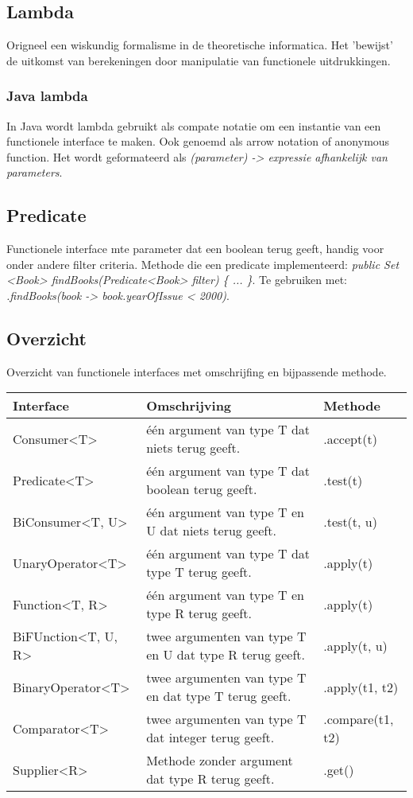 \subsection{Lambda}
Origneel een wiskundig formalisme in de theoretische informatica.
Het 'bewijst' de uitkomst van berekeningen door manipulatie van functionele uitdrukkingen.

\subsubsection{Java lambda}
In Java wordt lambda gebruikt als compate notatie om een instantie van een functionele interface te maken.
Ook genoemd als arrow notation of anonymous function.
Het wordt geformateerd als \textit{(parameter) -> expressie afhankelijk van parameters}.

\subsection{Predicate}
Functionele interface mte parameter dat een boolean terug geeft, handig voor onder andere filter criteria.
Methode die een predicate implementeerd: \textit{public Set <Book> findBooks(Predicate<Book> filter) \{ ... \}}.
Te gebruiken met: \textit{.findBooks(book -> book.yearOfIssue < 2000)}.

\subsection{Overzicht}
Overzicht van functionele interfaces met omschrijfing en bijpassende methode.
\begin{center}
    \begin{longtable}{lp{5cm}l}
        Interface   & Omschrijving & Methode \\
        \midrule
        Consumer<T>         & \'e\'en argument van type T dat niets terug geeft.        & .accept(t) \\
        Predicate<T>        & \'e\'en argument van type T dat boolean terug geeft.      & .test(t) \\
        BiConsumer<T, U>    & \'e\'en argument van type T en U dat niets terug geeft.   & .test(t, u) \\
        UnaryOperator<T>    & \'e\'en argument van type T dat type T terug geeft.       & .apply(t) \\
        Function<T, R>      & \'e\'en argument van type T en type R terug geeft.        & .apply(t) \\
        BiFUnction<T, U, R> & twee argumenten van type T en U dat type R terug geeft.   & .apply(t, u) \\
        BinaryOperator<T>   & twee argumenten van type T en dat type T terug geeft.     & .apply(t1, t2) \\
        Comparator<T>       & twee argumenten van type T dat integer terug geeft.       & .compare(t1, t2) \\
        Supplier<R>         & Methode zonder argument dat type R terug geeft.           & .get() \\
        \bottomrule
    \end{longtable}
\end{center}

